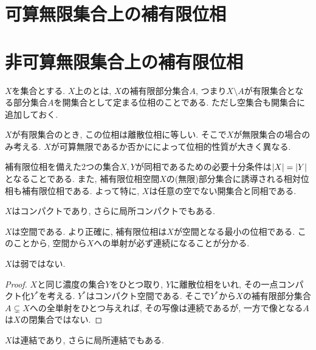 \documentclass[uplatex, dvipdfmx, a4paper, 12pt, class=jsbook, crop=false]{standalone}
\begin{document}
\section{可算無限集合上の補有限位相}
\label{ex:cofinite-topology-on-countably-infinite-set}
\section{非可算無限集合上の補有限位相}
\label{ex:cofinite-topology-on-uncountably-infinite-set}

$ X $を集合とする. $ X $上のとは, $ X $の補有限部分集合$ A $, つまり$ X \setminus A $が有限集合となる部分集合$ A $を開集合として定まる位相のことである. ただし空集合も開集合に追加しておく.

$ X $が有限集合のとき, この位相は離散位相に等しい. そこで$ X $が無限集合の場合のみ考える. $ X $が可算無限であるか否かにによって位相的性質が大きく異なる.

\begin{property}
	補有限位相を備えた2つの集合$ X, Y $が同相であるための必要十分条件は$ \left|X\right| = \left|Y\right| $となることである. また, 補有限位相空間$ X $の(無限)部分集合に誘導される相対位相も補有限位相である. よって特に, $ X $は任意の空でない開集合と同相である.
\end{property}

\begin{property}
	$ X $はコンパクトであり, さらに局所コンパクトでもある.
\end{property}

\begin{property}
	$ X $は空間である. より正確に, 補有限位相は$ X $が空間となる最小の位相である. このことから, 空間から$ X $への単射が必ず連続になることが分かる.
\end{property}

\begin{property}
	$ X $は弱\Hausdorff ではない.
\end{property}
\begin{proof}
	$ X $と同じ濃度の集合$ Y $をひとつ取り, $ Y $に離散位相をいれ, その一点コンパクト化$ Y^\ast $を考える. $ Y^\ast $はコンパクト\Hausdorff 空間である. そこで$ Y^\ast $から$ X $の補有限部分集合$ A \subsetneq X $への全単射をひとつ与えれば, その写像は連続であるが, 一方で像となる$ A $は$ X $の閉集合ではない. 
\end{proof}

\begin{property}
	$ X $は連結であり, さらに局所連結でもある.
\end{property}
\end{document}
